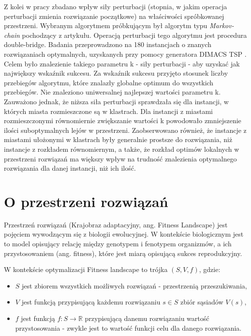 Z kolei w pracy\cite{DBLP:conf/evoW/McMenemyVO18} zbadano wpływ siły perturbacji (stopnia, w jakim operacja perturbacji zmienia rozwiązanie początkowe)
na właściwości spróbkowanej przestrzeni. Wybranym algorytmem próbkującym był algorytm typu \textit{Markov-chain} pochodzący z artykułu\cite{DBLP:journals/heuristics/OchoaV18}.
Operacją perturbacji tego algorytmu jest procedura double-bridge. Badania przeprowadzono na 180 instancjach o znanych rozwiązaniach optymalnych,
uzyskanych przy pomocy generatora DIMACS TSP . Celem było znalezienie takiego parametru k - siły perturbacji - aby uzyskać jak największy wskaźnik sukcesu.
Za wskaźnik sukcesu przyjęto stosunek liczby przebiegów algorytmu, które znalazły globalne optimum do wszystkich przebiegów.
Nie znaleziono uniwersalnej najlepszej wartości parametru k. Zauważono jednak, że niższa siła perturbacji sprawdzała się dla instancji,
w których miasta rozmieszczone są w klastrach. Dla instancji z miastami rozmieszczonymi równomiernie zwiększanie wartości k powodowało
zmniejszenie ilości suboptymalnych lejów w przestrzeni.
Zaobserwowano również, że instancje z miastami ułożonymi w klastrach były generalnie prostsze do rozwiązania, niż instancje z rozkładem równomiernym,
a także, że rozkład optimów lokalnych w przestrzeni rozwiązań ma większy wpływ na trudność znalezienia optymalnego rozwiązania dla
danej instancji, niż ich ilość.

\section{O przestrzeni rozwiązań}
Przestrzeń rozwiązań (Krajobraz adaptacyjny, ang. Fitness Landscape) jest pojęciem wywodzącym się z biologii ewolucyjnej.
W kontekście biologicznym jest to model opisujący relację między genotypem i fenotypem organizmów, a ich przystosowaniem (ang. fitness),
które jest miarą opisującą sukces reprodukcyjny\cite{FRAGATA201969}.

W kontekście optymalizacji Fitness landscape to trójka $(S, V, f)$, gdzie:
\begin{itemize}
      \item $S$ jest zbiorem wszystkich możliwych rozwiązań - przestrzenią przeszukiwania,
      \item $V$ jest funkcją przypisującą każdemu rozwiązaniu $s\in{S}$ zbiór sąsiadów $V(s)$,
      \item $f$ jest funkcją $f:S \rightarrow \mathbb{R}$ przypisującą danemu rozwiązaniu wartość przystosowania
            - zwykle jest to wartość funkcji celu dla danego rozwiązania.
\end{itemize}

